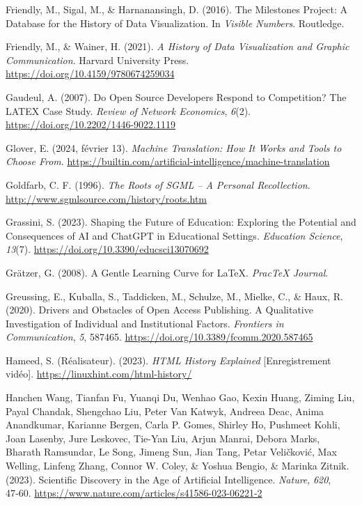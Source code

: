 \documentclass[
  letterpaper,
  DIV=11,
  numbers=noendperiod,
  oneside]{scrreprt}
\newlength{\cslhangindent}
\newlength{\cslentryspacingunit} %
\newenvironment{CSLReferences}[2] %
 {%
  \setlength{\parindent}{0pt}
  \ifodd #1
  \let\oldpar\par
  \def\par{\hangindent=\cslhangindent\oldpar}
  \fi
  \setlength{\parskip}{#2\cslentryspacingunit}
 }%
 {}
\begin{document}
\begin{CSLReferences}{1}{0}
\leavevmode{}%
Friendly, M., Sigal, M., \& Harnanansingh, D. (2016). The {Milestones
Project}: {A Database} for the {History} of {Data Visualization}. In
\emph{Visible {Numbers}}. Routledge.

\leavevmode{}%
Friendly, M., \& Wainer, H. (2021). \emph{A {History} of {Data
Visualization} and {Graphic Communication}}. Harvard University Press.
\url{https://doi.org/10.4159/9780674259034}

\leavevmode{}%
Gaudeul, A. (2007). Do {Open Source Developers Respond} to
{Competition}? {The LATEX Case Study}. \emph{Review of Network
Economics}, \emph{6}(2). \url{https://doi.org/10.2202/1446-9022.1119}

\leavevmode{}%
Glover, E. (2024, février 13). \emph{Machine {Translation}: {How It
Works} and {Tools} to {Choose From}}.
\url{https://builtin.com/artificial-intelligence/machine-translation}

\leavevmode{}%
Goldfarb, C. F. (1996). \emph{The {Roots} of {SGML} -- {A Personal
Recollection}}. \url{http://www.sgmlsource.com/history/roots.htm}

\leavevmode{}%
Grassini, S. (2023). Shaping the {Future} of {Education}: {Exploring}
the {Potential} and {Consequences} of {AI} and {ChatGPT} in {Educational
Settings}. \emph{Education Science}, \emph{13}(7).
\url{https://doi.org/10.3390/educsci13070692}

\leavevmode{}%
Grätzer, G. (2008). A Gentle Learning Curve for {LaTeX}. \emph{PracTeX
Journal}.

\leavevmode{}%
Greussing, E., Kuballa, S., Taddicken, M., Schulze, M., Mielke, C., \&
Haux, R. (2020). Drivers and {Obstacles} of {Open Access Publishing}. {A
Qualitative Investigation} of {Individual} and {Institutional Factors}.
\emph{Frontiers in Communication}, \emph{5}, 587465.
\url{https://doi.org/10.3389/fcomm.2020.587465}

\leavevmode{}%
Hameed, S. (Réalisateur). (2023). \emph{{HTML History} \textbar{}
{Explained}} {[}Enregistrement vidéo{]}.
\url{https://linuxhint.com/html-history/}

\leavevmode{}%
Hanchen Wang, Tianfan Fu, Yuanqi Du, Wenhao Gao, Kexin Huang, Ziming
Liu, Payal Chandak, Shengchao Liu, Peter Van Katwyk, Andreea Deac, Anima
Anandkumar, Karianne Bergen, Carla P. Gomes, Shirley Ho, Pushmeet Kohli,
Joan Lasenby, Jure Leskovec, Tie-Yan Liu, Arjun Manrai, Debora Marks,
Bharath Ramsundar, Le Song, Jimeng Sun, Jian Tang, Petar Veličković, Max
Welling, Linfeng Zhang, Connor W. Coley, \& Yoshua Bengio, \& Marinka
Zitnik. (2023). Scientific Discovery in the Age of Artificial
Intelligence. \emph{Nature}, \emph{620}, 47‑60.
\url{https://www.nature.com/articles/s41586-023-06221-2}


\end{CSLReferences}
\end{document}
